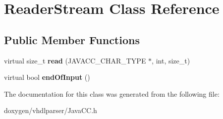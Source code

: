 \hypertarget{class_reader_stream}{}\section{Reader\+Stream Class Reference}
\label{class_reader_stream}
\subsection*{Public Member Functions}
\begin{DoxyCompactItemize}
\item 
\mbox{\label{class_reader_stream_a0d4604f72e5a2f639b626cdd8f178125}} 
virtual size\+\_\+t {\bfseries read} (J\+A\+V\+A\+C\+C\+\_\+\+C\+H\+A\+R\+\_\+\+T\+Y\+PE $\ast$, int, size\+\_\+t)
\item 
\mbox{\label{class_reader_stream_a0d3ffd30d18754abb973f55fe7154d36}} 
virtual bool {\bfseries end\+Of\+Input} ()
\end{DoxyCompactItemize}


The documentation for this class was generated from the following file\+:\begin{DoxyCompactItemize}
\item 
doxygen/vhdlparser/Java\+C\+C.\+h\end{DoxyCompactItemize}
